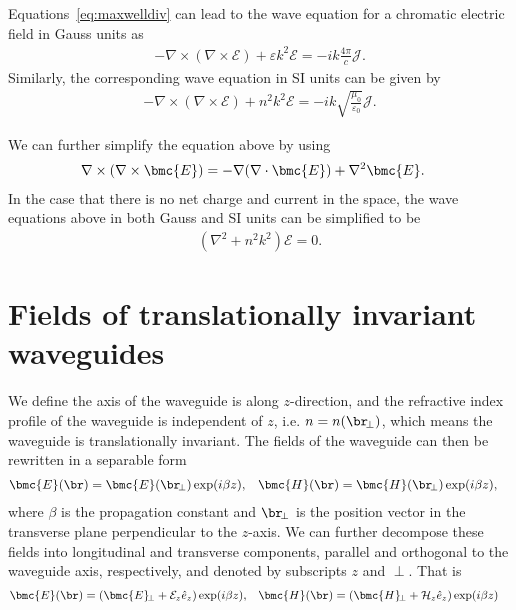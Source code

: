 Equations~\eqref{eq:maxwelldiv} can lead to the wave equation for a chromatic electric field in Gauss units as
\begin{align}
-\nabla \times (\nabla \times \boldsymbol{\mathcal{E}})+\varepsilon k^2\boldsymbol{\mathcal{E}}=-ik\frac{4\pi}{c} \boldsymbol{\mathcal{J}}. \label{eq:waveeqGaussU}
\end{align}
Similarly, the corresponding wave equation in SI units can be given by
\begin{align}
-\nabla \times (\nabla \times \boldsymbol{\mathcal{E}})+ n^2 k^2\boldsymbol{\mathcal{E}}=-ik\sqrt{\frac{\mu_0}{\varepsilon_0}} \boldsymbol{\mathcal{J}}.
\end{align}

We can further simplify the equation above by using 
\begin{align}
\nabla\times (\nabla\times \bmc{E}) &= -\nabla(\nabla\cdot \bmc{E})+ \nabla^2\bmc{E}. 
\end{align}
In the case that there is no net charge and current in the space, the wave equations above in both Gauss and SI units can be simplified to be
\begin{align}\label{eq:freespacewaveeq}
(\nabla^2 + n^2k^2) \boldsymbol{\mathcal{E}}=0.
\end{align}

\section{Fields of translationally invariant waveguides}
We define the axis of the waveguide is along $ z $-direction, and the refractive index profile of the 
waveguide is independent of $ z $, i.e. $ n=n(\br\!_\perp) $, which means the waveguide is 
translationally invariant. The fields of the waveguide can then be rewritten in a separable form
\begin{align}
\bmc{E}(\br) &= \bmc{E}(\br\!_\perp)\exp(i\beta z), & \bmc{H}(\br) &= \bmc{H}(\br\!_\perp)\exp(i\beta 
z),
\end{align}
where $ \beta $ is the propagation constant and $ \br\!_\perp $ is the position vector in the transverse 
plane perpendicular to the $ z $-axis. We can further decompose these fields into longitudinal and 
transverse components, parallel and orthogonal to the waveguide axis, respectively, and denoted by 
subscripts $ z $ and $ \perp $. That is
\begin{align}\label{EHtranslong}
\bmc{E}(\br) &= \left( \bmc{E}\!_\perp + \mathcal{E}_z \hat{e}_z \right)\exp(i\beta z), & \bmc{H}(\br) &= 
\left( \bmc{H}\!_\perp + \mathcal{H}_z \hat{e}_z\right) \exp(i\beta z)
\end{align}

